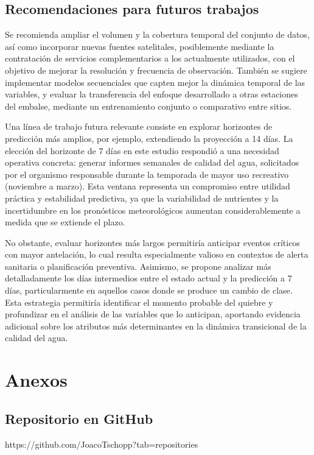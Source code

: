 \documentclass[11pt]{report}
\begin{document}
\section{Recomendaciones para futuros trabajos}

Se recomienda ampliar el volumen y la cobertura temporal del conjunto de datos, así como incorporar nuevas fuentes satelitales, posiblemente mediante la contratación de servicios complementarios a los actualmente utilizados, con el objetivo de mejorar la resolución y frecuencia de observación. También se sugiere implementar modelos secuenciales que capten mejor la dinámica temporal de las variables, y evaluar la transferencia del enfoque desarrollado a otras estaciones del embalse, mediante un entrenamiento conjunto o comparativo entre sitios.

Una línea de trabajo futura relevante consiste en explorar horizontes de predicción más amplios, por ejemplo, extendiendo la proyección a 14 días. La elección del horizonte de 7 días en este estudio respondió a una necesidad operativa concreta: generar informes semanales de calidad del agua, solicitados por el organismo responsable durante la temporada de mayor uso recreativo (noviembre a marzo). Esta ventana representa un compromiso entre utilidad práctica y estabilidad predictiva, ya que la variabilidad de nutrientes y la incertidumbre en los pronósticos meteorológicos aumentan considerablemente a medida que se extiende el plazo.

No obstante, evaluar horizontes más largos permitiría anticipar eventos críticos con mayor antelación, lo cual resulta especialmente valioso en contextos de alerta sanitaria o planificación preventiva. Asimismo, se propone analizar más detalladamente los días intermedios entre el estado actual y la predicción a 7 días, particularmente en aquellos casos donde se produce un cambio de clase. Esta estrategia permitiría identificar el momento probable del quiebre y profundizar en el análisis de las variables que lo anticipan, aportando evidencia adicional sobre los atributos más determinantes en la dinámica transicional de la calidad del agua.


\cleardoublepage






\appendix
\chapter{Anexos}
\section{Repositorio en GitHub}

https://github.com/JoacoTschopp?tab=repositories
\end{document}
